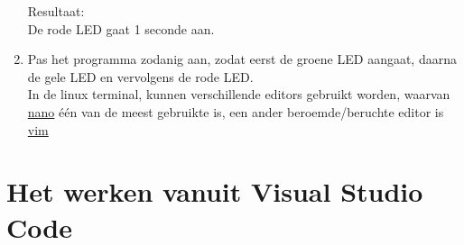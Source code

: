 \begin{enumerate}
\begin{itemize}
\end{itemize}
Resultaat:\\	
De rode LED gaat 1 seconde aan.

\item Pas het programma zodanig aan, zodat eerst de groene LED aangaat, daarna de gele LED en vervolgens de rode LED. \\
In de linux terminal, kunnen verschillende editors gebruikt worden, waarvan \href{https://linuxize.com/post/how-to-use-nano-text-editor/}{nano} \'{e}\'{e}n van de meest gebruikte is, een ander beroemde/beruchte editor is \href{https://opensource.com/article/19/3/getting-started-vim}{vim}  

\end{enumerate}

\section{Het werken vanuit Visual Studio Code}

